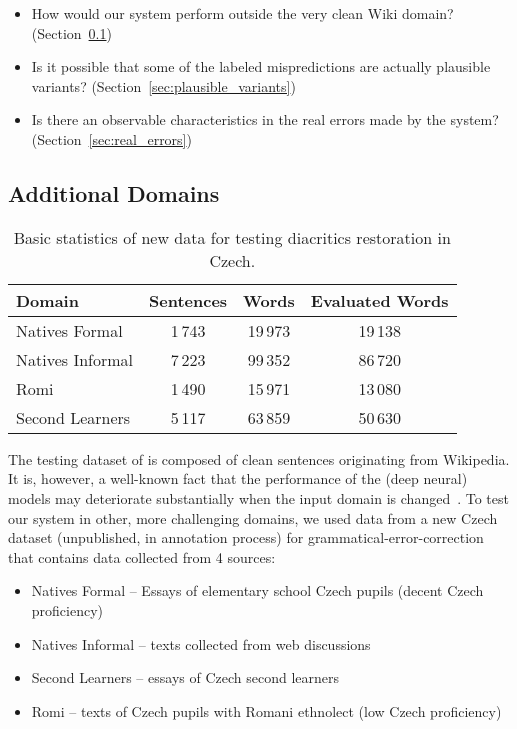 \documentclass{pbmlarxiv}
\begin{document}
\begin{itemize}
    \item How would our system perform outside the very clean Wiki domain? (Section~\ref{sec:other_domains})
    \item Is it possible that some of the labeled mispredictions are actually plausible variants? (Section~\ref{sec:plausible_variants})
    \item Is there an observable characteristics in the real errors made by the system? (Section~\ref{sec:real_errors})
\end{itemize}

\subsection{Additional Domains}
\label{sec:other_domains}

\begin{table}[t]
    \centering
    \begin{tabular}{lccc}\toprule
    Domain  & Sentences & Words & Evaluated Words \\\midrule
    Natives Formal & 1\,743 & 19\,973 & 19\,138 \\
    Natives Informal & 7\,223 & 99\,352 & 86\,720 \\
    Romi & 1\,490 & 15\,971 & 13\,080 \\
    Second Learners & 5\,117 & 63\,859 & 50\,630 \\\bottomrule
    \end{tabular}
    \caption{Basic statistics of new data for testing diacritics restoration in Czech.}
    \label{table:basic_other_domains}
\end{table}



The testing dataset of \citet{naplava2018diacritics} is composed of clean sentences originating from Wikipedia. It is, however, a well-known fact that the performance of the (deep neural) models may deteriorate substantially when the input domain is changed~\cite{belinkov2017synthetic, rychalska2019models}. To test our system in other, more challenging domains, we used data from a new Czech dataset (unpublished, in annotation process) for grammatical-error-correction that contains data collected from 4 sources:

\begin{itemize}
    \item Natives Formal -- Essays of elementary school Czech pupils (decent Czech proficiency)
    \item Natives Informal -- texts collected from web discussions
    \item Second Learners -- essays of Czech second learners
    \item Romi -- texts of Czech pupils with Romani ethnolect (low Czech proficiency)
\end{itemize}
\end{document}
